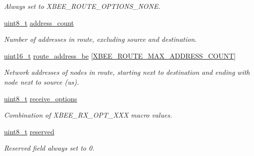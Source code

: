 \begin{DoxyCompactItemize}
\begin{DoxyCompactList}\small\item\em Always set to X\-B\-E\-E\-\_\-\-R\-O\-U\-T\-E\-\_\-\-O\-P\-T\-I\-O\-N\-S\-\_\-\-N\-O\-N\-E. \end{DoxyCompactList}\item 
\hyperlink{group__hal_gae1affc9ca37cfb624959c866a73f83c2}{uint8\-\_\-t} \hyperlink{group__xbee__route_ga568b7e68dfcb5aabdbcf38de26f1b63d}{address\-\_\-count}
\begin{DoxyCompactList}\small\item\em Number of addresses in route, excluding source and destination. \end{DoxyCompactList}\item 
\hyperlink{group__hal_ga5a8b2dc9e45a9ee81a94ef304fb62505}{uint16\-\_\-t} \hyperlink{group__xbee__route_ga943070c7e317d394725c1e65ef4efd04}{route\-\_\-address\-\_\-be} \mbox{[}\hyperlink{group__xbee__route_ga41b7c2f8ef5f6e4912572871790611d2}{X\-B\-E\-E\-\_\-\-R\-O\-U\-T\-E\-\_\-\-M\-A\-X\-\_\-\-A\-D\-D\-R\-E\-S\-S\-\_\-\-C\-O\-U\-N\-T}\mbox{]}
\begin{DoxyCompactList}\small\item\em Network addresses of nodes in route, starting next to destination and ending with node next to source (us). \end{DoxyCompactList}\item 
\hypertarget{group__xbee__route_gabf2f34f6b8fa4870cb757aa844335a4f}{\hyperlink{group__hal_gae1affc9ca37cfb624959c866a73f83c2}{uint8\-\_\-t} \hyperlink{group__xbee__route_gabf2f34f6b8fa4870cb757aa844335a4f}{receive\-\_\-options}}\label{group__xbee__route_gabf2f34f6b8fa4870cb757aa844335a4f}

\begin{DoxyCompactList}\small\item\em Combination of X\-B\-E\-E\-\_\-\-R\-X\-\_\-\-O\-P\-T\-\_\-\-X\-X\-X macro values. \end{DoxyCompactList}\item 
\hypertarget{group__xbee__route_gacb7bc06bed6f6408d719334fc41698c7}{\hyperlink{group__hal_gae1affc9ca37cfb624959c866a73f83c2}{uint8\-\_\-t} \hyperlink{group__xbee__route_gacb7bc06bed6f6408d719334fc41698c7}{reserved}}\label{group__xbee__route_gacb7bc06bed6f6408d719334fc41698c7}

\begin{DoxyCompactList}\small\item\em Reserved field always set to 0. \end{DoxyCompactList}\end{DoxyCompactItemize}


